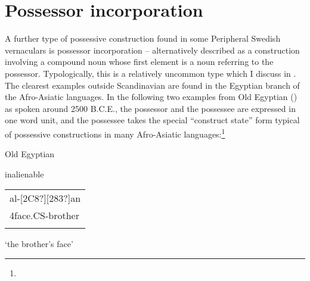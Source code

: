 \section{Possessor incorporation}

\begin{styleBodyTextFirst}
A further type of possessive construction found in some Peripheral Swedish vernaculars is possessor incorporation – alternatively described as a construction involving a compound noun whose first element is a noun referring to the possessor. Typologically, this is a relatively uncommon type which I discuss in \citet{Dahl2004}. The clearest examples outside Scandinavian are found in the Egyptian branch of the Afro-Asiatic languages. In the following two examples from Old Egyptian (\citet{Kammerzell2000}) as spoken around 2500 B.C.E., the possessor and the possessee are expressed in one word unit, and the possessee takes the special “construct state” form typical of possessive constructions in many Afro-Asiatic languages:\footnote{}

\end{styleBodyTextFirst}

\begin{listWWNumileveli}
\item {}

\begin{styleExample}
Old Egyptian

\end{styleExample}

\end{listWWNumileveli}

\begin{listWWNumlxxxviiileveli}
\item {}

\begin{styleExLtrTbl}
inalienable

\end{styleExLtrTbl}

\end{listWWNumlxxxviiileveli}

\begin{tabular}{l}
\lsptoprule
[127?]al-[2C8?][283?]an\\
4face.CS-brother\\
\lspbottomrule
\end{tabular}

\begin{styleTranslation}
‘the brother’s face’\ \ 

\end{styleTranslation}


